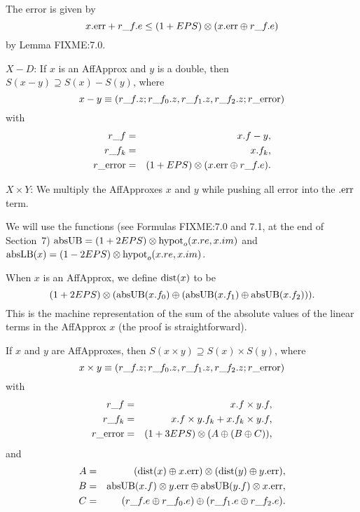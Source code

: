 The error is given by 
$$x.{\rm err} + r\_f.e \le (1 + EPS) \otimes (x.{\rm err} \oplus r\_f.e)$$
by Lemma FIXME:7.0. \enddemo

$X - D$:
\hskip-8pt If $x$ is an 
{\rm AffApprox}  and $y$ is a double{\rm ,}
then $S(x - y) \supseteq S(x) - S(y)${\rm ,} where
$$x - y \equiv (r\_f.z; r\_f_0.z, r\_f_1.z, r\_f_2.z; r\_{\rm error})$$
with
\begin{eqnarray*}
r\_f &= &x.f - y,\\
r\_f_k &=& x.f_k,\\
r\_{\rm error}& =& (1 + EPS) \otimes (x.{\rm err} \oplus r\_f.e).\end{eqnarray*}
\endproclaim

$X \times Y$: 
We multiply the AffApproxes $x$ and $y$ while pushing all error into the $.{\rm err}$ term.

We will use the functions (see Formulas FIXME:7.0 and 7.1, at the end of Section~7) ${\rm absUB}= (1 + 2EPS) \otimes
{\rm hypot}_o(x.re,x.im)$ and 
${\rm absLB}(x) = (1 - 2EPS) \otimes {\rm hypot}_o(x.re,x.im)$.

When $x$ is an AffApprox, we define ${\rm dist}(x)$ to be $$(1 + 2EPS) \otimes ({\rm absUB}(x.f_0) \oplus ({\rm absUB}(x.f_1) \oplus {\rm absUB}(x.f_2))).$$  This is the machine representation of the sum of the absolute values of the linear terms in the AffApprox $x$ 
(the proof is straightforward).

 If $x$ and $y$ are 
{\rm AffApproxes,}
then $S(x \times y) \supseteq S(x) \times S(y)${\rm ,} where
$$x \times y \equiv (r\_f.z; r\_f_0.z, r\_f_1.z, r\_f_2.z; r\_{\rm error})$$
with
\begin{eqnarray*}
r\_f &=& x.f \times y.f,\\
r\_f_k &=& x.f \times y.f_k + x.f_k \times y.f,\\
r\_{\rm error} &=& 
(1 + 3EPS) \otimes (A \oplus (B \oplus C)),\end{eqnarray*}
and
\begin{eqnarray*}
A &=& ({\rm dist}(x) \oplus x.{\rm err})\otimes ({\rm dist}(y) \oplus y.{\rm err}),
\\
B& =& {\rm absUB}(x.f) \otimes
y.{\rm err} \oplus {\rm absUB}(y.f) \otimes x.{\rm err},\\
C& =& (r\_f.e \oplus r\_f_0.e) \oplus (r\_f_1.e \oplus
r\_f_2.e).\end{eqnarray*}
\endproclaim

